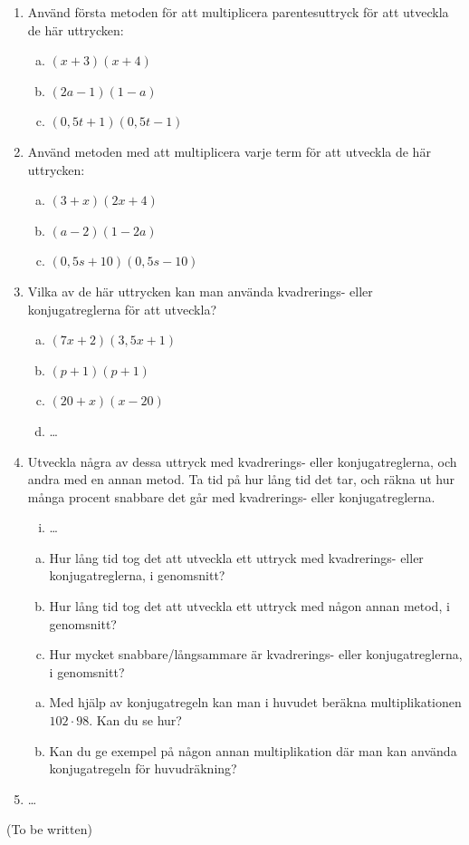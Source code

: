 \begin{enumerate}
  \item Använd första metoden för att multiplicera parentesuttryck för att utveckla de här uttrycken:
  \begin{enumerate}[a)]
    \item $(x+3)(x+4)$
    \item $(2a-1)(1-a)$
    \item $(0{,}5t+1)(0{,}5t-1)$
  \end{enumerate}
  \item Använd metoden med att multiplicera varje term för att utveckla de här uttrycken:
  \begin{enumerate}[a)]
    \item $(3+x)(2x+4)$
    \item $(a-2)(1-2a)$
    \item $(0{,}5s+10)(0{,}5s-10)$
  \end{enumerate}
  \item Vilka av de här uttrycken kan man använda kvadrerings- eller konjugatreglerna för att utveckla?
  \begin{enumerate}[a)]
    \item $(7x+2)(3{,}5x+1)$
    \item $(p+1)(p+1)$
    \item $(20+x)(x-20)$
    \item \ldots
  \end{enumerate}
  \item Utveckla några av dessa uttryck med kvadrerings- eller konjugatreglerna, och andra med en annan metod.
  Ta tid på hur lång tid det tar, och räkna ut hur många procent snabbare det går med kvadrerings- eller konjugatreglerna.
  \begin{enumerate}[i)]
    \item \ldots
  \end{enumerate}
  \begin{enumerate}[a)]
    \item Hur lång tid tog det att utveckla ett uttryck med kvadrerings- eller konjugatreglerna, i genomsnitt?
    \item Hur lång tid tog det att utveckla ett uttryck med någon annan metod, i genomsnitt?
    \item Hur mycket snabbare/långsammare är kvadrerings- eller konjugatreglerna, i genomsnitt?
  \end{enumerate}
  \begin{enumerate}[a)]
    \item Med hjälp av konjugatregeln kan man i huvudet beräkna multiplikationen $102 \cdot 98$. Kan du se hur?
    \item Kan du ge exempel på någon annan multiplikation där man kan använda konjugatregeln för huvudräkning?
  \end{enumerate}
  \item \ldots
  
\end{enumerate}

(To be written)
